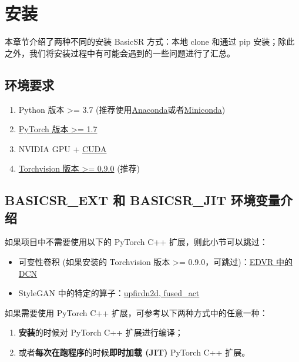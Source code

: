 \documentclass[../main.tex]{subfiles}
\begin{document}
\chapter{安装}
\vspace{-2cm}

本章节介绍了两种不同的安装 BasicSR 方式：本地 clone 和通过 pip 安装；除此之外，我们将安装过程中有可能会遇到的一些问题进行了汇总。

\section{环境要求}

\begin{enumerate}
    \item Python 版本 >= 3.7 (推荐使用\href{https://www.anaconda.com/products/distribution#linux}{Anaconda}或者\href{https://docs.conda.io/en/latest/miniconda.html}{Miniconda})
    \item \href{https://pytorch.org/}{PyTorch 版本 >= 1.7}
    \item NVIDIA GPU + \href{https://developer.nvidia.com/cuda-downloads}{CUDA}
    \item \href{https://pytorch.org/}{Torchvision 版本 >= 0.9.0} (推荐)
\end{enumerate}

\section{BASICSR\_EXT 和 BASICSR\_JIT 环境变量介绍}
\label{section:env}

如果项目中不需要使用以下的 PyTorch C++ 扩展，则此小节可以跳过：

\begin{itemize}
    \item 可变性卷积 (如果安装的 Torchvision 版本 >= 0.9.0，可跳过)：\href{https://github.com/XPixelGroup/BasicSR/tree/master/basicsr/ops}{EDVR 中的 DCN}

    \item StyleGAN 中的特定的算子：\href{https://github.com/XPixelGroup/BasicSR/tree/master/basicsr/ops}{upfirdn2d, fused\_act}
\end{itemize}

如果需要使用 PyTorch C++ 扩展，可参考以下两种方式中的任意一种：

\begin{enumerate}
    \item \textbf{安装}的时候对 PyTorch C++ 扩展进行编译；
    \item 或者\textbf{每次在跑程序}的时候\textbf{即时加载 (JIT)} PyTorch C++ 扩展。
\end{enumerate}
\end{document}
